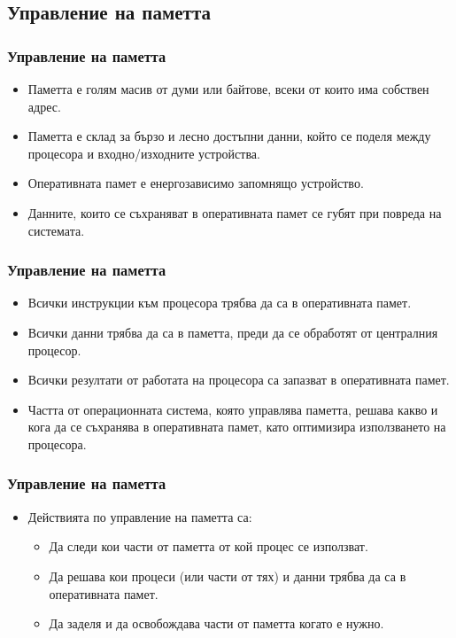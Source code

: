 \documentclass[ignorenonframetext, hyperref=unicode]{beamer}
\begin{document}
\subsection{Управление на паметта}

\begin{frame}
\frametitle{Управление на паметта}
\begin{itemize}
\item Паметта е голям масив от думи или байтове, всеки от които има собствен
адрес.
\item Паметта е склад за бързо и лесно достъпни данни, който се поделя между
процесора и входно/изходните устройства.
\item Оперативната памет е енергозависимо запомнящо устройство. 
\item Данните, които
се съхраняват в оперативната памет се губят при повреда на системата.
\end{itemize}
\end{frame}

\begin{frame}
\frametitle{Управление на паметта}
\begin{itemize}
\item Всички инструкции към процесора трябва да са в оперативната памет.
\item Всички данни трябва да са в паметта,
преди да се обработят от централния процесор.
\item Всички резултати от работата на процесора са запазват в оперативната
памет.
\item Частта от операционната система, която управлява паметта, решава какво и
кога да се съхранява в оперативната памет, като оптимизира използването на
процесора.
\end{itemize}
\end{frame}

\begin{frame}
\frametitle{Управление на паметта}
\begin{itemize}
\item Действията по управление на паметта са:
\begin{itemize}
  \item Да следи кои части от паметта от кой процес се използват.
  \item Да решава кои процеси (или части от тях) и данни трябва да са в
  оперативната памет.
  \item Да заделя и да освобождава части от паметта когато е нужно.
\end{itemize}
\end{itemize}
\end{frame}
\end{document}
